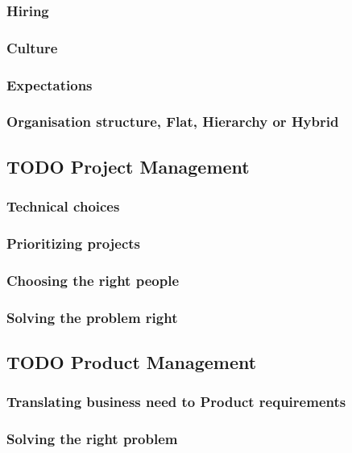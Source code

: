 \documentclass[10pt,conference]{IEEEtran}
\begin{document}
\subsubsection*{Hiring}
\subsubsection*{Culture}
\subsubsection*{Expectations}
\subsubsection*{Organisation structure, Flat, Hierarchy or Hybrid}

\subsection*{TODO Project Management}

\subsubsection*{Technical choices}
\subsubsection*{Prioritizing projects}
\subsubsection*{Choosing the right people}
\subsubsection*{Solving the problem right}

\subsection*{TODO Product Management}

\subsubsection*{Translating business need to Product requirements}
\subsubsection*{Solving the right problem}
\end{document}
